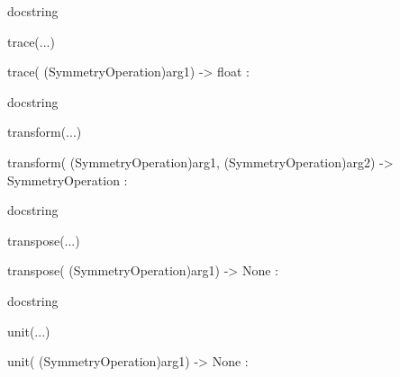 \documentclass[letterpaper,10pt,english]{sphinxmanual}
\begin{document}
\begin{description}
\begin{description}
\begin{DUlineblock}{0em}
\begin{DUlineblock}{\DUlineblockindent}
\begin{DUlineblock}{\DUlineblockindent}
\item[] docstring
\item[] 
\end{DUlineblock}
\end{DUlineblock}
\item[] trace(...)
\item[]
\begin{DUlineblock}{\DUlineblockindent}
\item[] trace( (SymmetryOperation)arg1) -\textgreater{} float :
\item[]
\begin{DUlineblock}{\DUlineblockindent}
\item[] docstring
\item[] 
\end{DUlineblock}
\end{DUlineblock}
\item[] transform(...)
\item[]
\begin{DUlineblock}{\DUlineblockindent}
\item[] transform( (SymmetryOperation)arg1, (SymmetryOperation)arg2) -\textgreater{} SymmetryOperation :
\item[]
\begin{DUlineblock}{\DUlineblockindent}
\item[] docstring
\item[] 
\end{DUlineblock}
\end{DUlineblock}
\item[] transpose(...)
\item[]
\begin{DUlineblock}{\DUlineblockindent}
\item[] transpose( (SymmetryOperation)arg1) -\textgreater{} None :
\item[]
\begin{DUlineblock}{\DUlineblockindent}
\item[] docstring
\item[] 
\end{DUlineblock}
\end{DUlineblock}
\item[] unit(...)
\item[]
\begin{DUlineblock}{\DUlineblockindent}
\item[] unit( (SymmetryOperation)arg1) -\textgreater{} None :
\item[]

\end{DUlineblock}
\end{DUlineblock}
\end{description}
\end{description}
\end{document}
